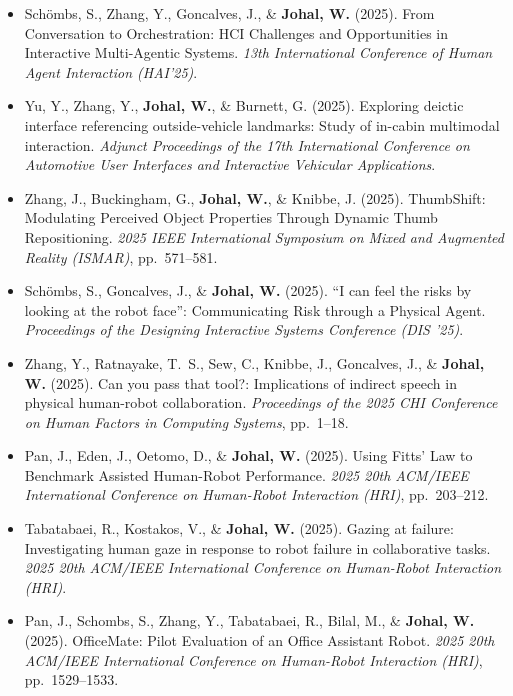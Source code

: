 \begin{itemize}[nosep]
    \item Schömbs, S., Zhang, Y., Goncalves, J., \& \textbf{Johal, W.} (2025). From Conversation to Orchestration: HCI Challenges and Opportunities in Interactive Multi-Agentic Systems. \textit{13th International Conference of Human Agent Interaction (HAI'25)}.

    \item Yu, Y., Zhang, Y., \textbf{Johal, W.}, \& Burnett, G. (2025). Exploring deictic interface referencing outside-vehicle landmarks: Study of in-cabin multimodal interaction. \textit{Adjunct Proceedings of the 17th International Conference on Automotive User Interfaces and Interactive Vehicular Applications}.

    \item Zhang, J., Buckingham, G., \textbf{Johal, W.}, \& Knibbe, J. (2025). ThumbShift: Modulating Perceived Object Properties Through Dynamic Thumb Repositioning. \textit{2025 IEEE International Symposium on Mixed and Augmented Reality (ISMAR)}, pp.\ 571--581.

    \item Schömbs, S., Goncalves, J., \& \textbf{Johal, W.} (2025). ``I can feel the risks by looking at the robot face'': Communicating Risk through a Physical Agent. \textit{Proceedings of the Designing Interactive Systems Conference (DIS '25)}.

    \item Zhang, Y., Ratnayake, T.\ S., Sew, C., Knibbe, J., Goncalves, J., \& \textbf{Johal, W.} (2025). Can you pass that tool?: Implications of indirect speech in physical human-robot collaboration. \textit{Proceedings of the 2025 CHI Conference on Human Factors in Computing Systems}, pp.\ 1--18.

    \item Pan, J., Eden, J., Oetomo, D., \& \textbf{Johal, W.} (2025). Using Fitts' Law to Benchmark Assisted Human-Robot Performance. \textit{2025 20th ACM/IEEE International Conference on Human-Robot Interaction (HRI)}, pp.\ 203--212.

    \item Tabatabaei, R., Kostakos, V., \& \textbf{Johal, W.} (2025). Gazing at failure: Investigating human gaze in response to robot failure in collaborative tasks. \textit{2025 20th ACM/IEEE International Conference on Human-Robot Interaction (HRI)}.

    \item Pan, J., Schombs, S., Zhang, Y., Tabatabaei, R., Bilal, M., \& \textbf{Johal, W.} (2025). OfficeMate: Pilot Evaluation of an Office Assistant Robot. \textit{2025 20th ACM/IEEE International Conference on Human-Robot Interaction (HRI)}, pp.\ 1529--1533.


\end{itemize}
